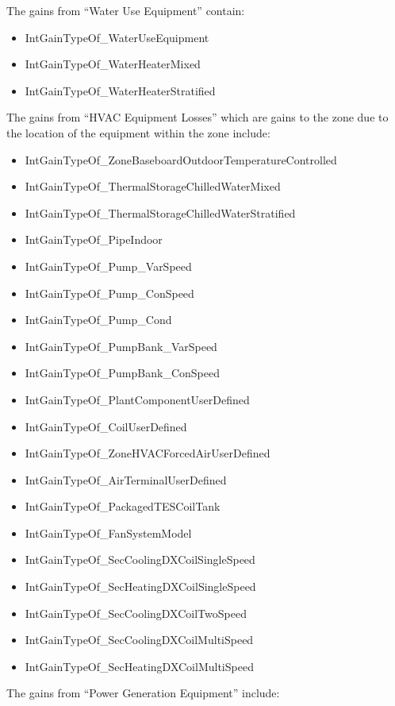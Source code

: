 The gains from ``Water Use Equipment'' contain:

\begin{itemize}
\item
  IntGainTypeOf\_WaterUseEquipment
\item
  IntGainTypeOf\_WaterHeaterMixed
\item
  IntGainTypeOf\_WaterHeaterStratified
\end{itemize}

The gains from ``HVAC Equipment Losses'' which are gains to the zone due to the location of the equipment within the zone include:

\begin{itemize}
\item
  IntGainTypeOf\_ZoneBaseboardOutdoorTemperatureControlled
\item
  IntGainTypeOf\_ThermalStorageChilledWaterMixed
\item
  IntGainTypeOf\_ThermalStorageChilledWaterStratified
\item
  IntGainTypeOf\_PipeIndoor
\item
  IntGainTypeOf\_Pump\_VarSpeed
\item
  IntGainTypeOf\_Pump\_ConSpeed
\item
  IntGainTypeOf\_Pump\_Cond
\item
  IntGainTypeOf\_PumpBank\_VarSpeed
\item
  IntGainTypeOf\_PumpBank\_ConSpeed
\item
  IntGainTypeOf\_PlantComponentUserDefined
\item
  IntGainTypeOf\_CoilUserDefined
\item
  IntGainTypeOf\_ZoneHVACForcedAirUserDefined
\item
  IntGainTypeOf\_AirTerminalUserDefined
\item
  IntGainTypeOf\_PackagedTESCoilTank
\item
  IntGainTypeOf\_FanSystemModel
\item
  IntGainTypeOf\_SecCoolingDXCoilSingleSpeed
\item
  IntGainTypeOf\_SecHeatingDXCoilSingleSpeed
\item
  IntGainTypeOf\_SecCoolingDXCoilTwoSpeed
\item
  IntGainTypeOf\_SecCoolingDXCoilMultiSpeed
\item
  IntGainTypeOf\_SecHeatingDXCoilMultiSpeed
\end{itemize}

The gains from ``Power Generation Equipment'' include:

